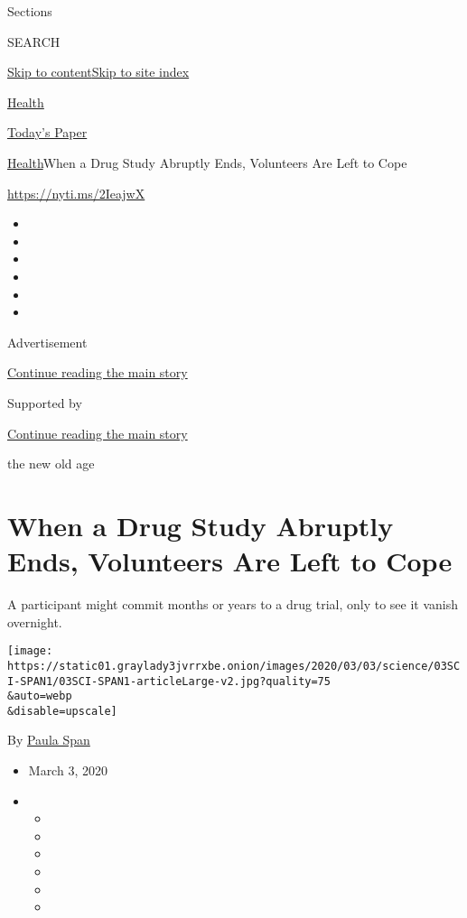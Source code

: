 Sections

SEARCH

\protect\hyperlink{site-content}{Skip to
content}\protect\hyperlink{site-index}{Skip to site index}

\href{https://www.nytimes3xbfgragh.onion/section/health}{Health}

\href{https://myaccount.nytimes3xbfgragh.onion/auth/login?response_type=cookie\&client_id=vi}{}

\href{https://www.nytimes3xbfgragh.onion/section/todayspaper}{Today's
Paper}

\href{/section/health}{Health}\textbar{}When a Drug Study Abruptly Ends,
Volunteers Are Left to Cope

\url{https://nyti.ms/2IeajwX}

\begin{itemize}
\item
\item
\item
\item
\item
\item
\end{itemize}

Advertisement

\protect\hyperlink{after-top}{Continue reading the main story}

Supported by

\protect\hyperlink{after-sponsor}{Continue reading the main story}

the new old age

\hypertarget{when-a-drug-study-abruptly-ends-volunteers-are-left-to-cope}{%
\section{When a Drug Study Abruptly Ends, Volunteers Are Left to
Cope}\label{when-a-drug-study-abruptly-ends-volunteers-are-left-to-cope}}

A participant might commit months or years to a drug trial, only to see
it vanish overnight.

\texttt{[image: https://static01.graylady3jvrrxbe.onion/images/2020/03/03/science/03SCI-SPAN1/03SCI-SPAN1-articleLarge-v2.jpg?quality=75\\\&auto=webp\\\&disable=upscale]}

By \href{https://www.nytimes3xbfgragh.onion/by/paula-span}{Paula Span}

\begin{itemize}
\item
  March 3, 2020
\item
  \begin{itemize}
  \item
  \item
  \item
  \item
  \item
  \item
  \end{itemize}
\end{itemize}

